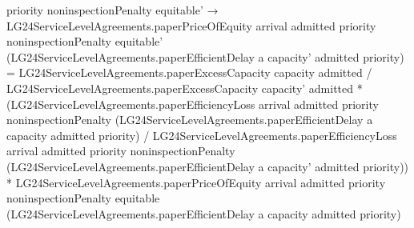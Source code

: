 \documentclass[10pt]{article}
\begin{document}
\begin{ReviewVerbatim}
                                      priority noninspectionPenalty equitable' →
                                    LG24ServiceLevelAgreements.paperPriceOfEquity arrival admitted priority
                                        noninspectionPenalty equitable'
                                        (LG24ServiceLevelAgreements.paperEfficientDelay a capacity' admitted priority) =
                                      LG24ServiceLevelAgreements.paperExcessCapacity capacity admitted /
                                            LG24ServiceLevelAgreements.paperExcessCapacity capacity' admitted *
                                          (LG24ServiceLevelAgreements.paperEfficiencyLoss arrival admitted priority
                                              noninspectionPenalty
                                              (LG24ServiceLevelAgreements.paperEfficientDelay a capacity admitted
                                                priority) /
                                            LG24ServiceLevelAgreements.paperEfficiencyLoss arrival admitted priority
                                              noninspectionPenalty
                                              (LG24ServiceLevelAgreements.paperEfficientDelay a capacity' admitted
                                                priority)) *
                                        LG24ServiceLevelAgreements.paperPriceOfEquity arrival admitted priority
                                          noninspectionPenalty equitable
                                          (LG24ServiceLevelAgreements.paperEfficientDelay a capacity admitted priority)
\end{ReviewVerbatim}
\end{document}

